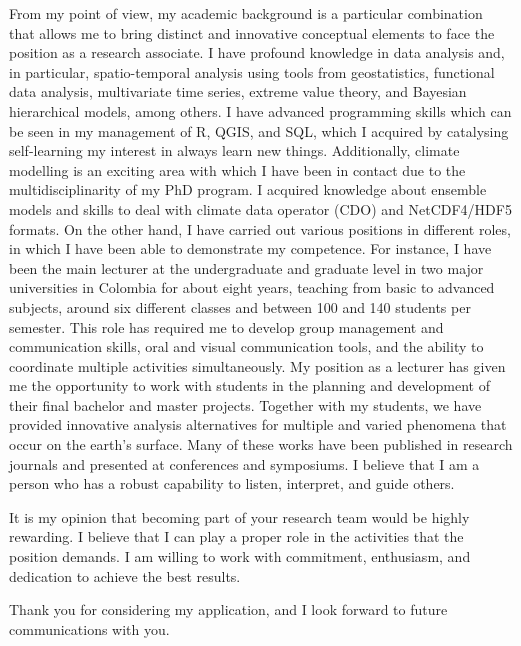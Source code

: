 \documentclass[11pt, a4paper]{awesome-cv}
\begin{document}
\begin{cvletter}
From my point of view, my academic background is a particular combination that allows me to bring distinct and innovative conceptual elements to face the position as a research associate. I have profound knowledge in data analysis and, in particular, spatio-temporal analysis using tools from geostatistics, functional data analysis, multivariate time series, extreme value theory, and Bayesian hierarchical models, among others. I have advanced programming skills which can be seen in my management of R, QGIS, and SQL, which I acquired by catalysing self-learning my interest in always learn new things. Additionally, climate modelling is an exciting area with which I have been in contact due to the multidisciplinarity of my PhD program. I acquired knowledge about ensemble models and skills to deal with climate data operator (CDO) and NetCDF4/HDF5 formats. On the other hand, I have carried out various positions in different roles, in which I have been able to demonstrate my competence. For instance, I have been the main lecturer at the undergraduate and graduate level in two major universities in Colombia for about eight years, teaching from basic to advanced subjects, around six different classes and between 100 and 140 students per semester. This role has required me to develop group management and communication skills, oral and visual communication tools, and the ability to coordinate multiple activities simultaneously. My position as a lecturer has given me the opportunity to work with students in the planning and development of their final bachelor and master projects. Together with my students, we have provided innovative analysis alternatives for multiple and varied phenomena that occur on the earth's surface. Many of these works have been published in research journals and presented at conferences and symposiums. I believe that I am a person who has a robust capability to listen, interpret, and guide others.\par 
It is my opinion that becoming part of your research team would be highly rewarding. I believe that I can play a proper role in the activities that the position demands. I am willing to work with commitment, enthusiasm, and dedication to achieve the best results.\par
Thank you for considering my application, and I look forward to future communications with you.
\end{cvletter}

\makeletterclosing
\end{document}
